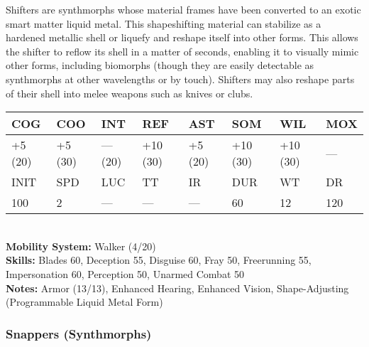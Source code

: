 Shifters are synthmorphs whose material frames have been converted to an exotic smart matter liquid metal. This shapeshifting material can stabilize as a hardened metallic shell or liquefy and reshape itself into other forms. This allows the shifter to reflow its shell in a matter of seconds, enabling it to visually mimic other forms, including biomorphs (though they are easily detectable as synthmorphs at other wavelengths or by touch). Shifters may also reshape parts of their shell into melee weapons such as knives or clubs. \\ \begin{tabular}{|l|l|l|l|l|l|l|l|} \hline

COG &COO &INT &REF &AST &SOM &WIL &MOX \\ \hline

+5 (20) &+5 (30) &— (20) &+10 (30) &+5 (20) &+10 (30) &+10 (30) &— \\ \hline

INIT &SPD &LUC &TT &IR &DUR &WT &DR \\ \hline

100 &2 &— &— &— &60 &12 &120 \\ \hline

\end{tabular} \\ \textbf{Mobility System: }Walker (4/20) \\ \textbf{Skills:} Blades 60, Deception 55, Disguise 60, Fray 50, Freerunning 55, Impersonation 60, Perception 50, Unarmed Combat 50 \\ \textbf{Notes: }Armor (13/13), Enhanced Hearing, Enhanced Vision, Shape-Adjusting (Programmable Liquid Metal Form) 

\subsubsection{Snappers (Synthmorphs)} 

